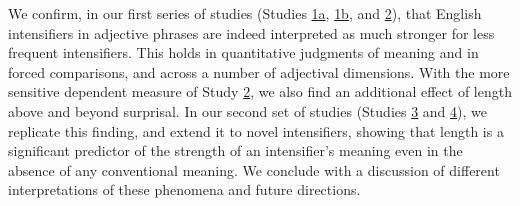 We confirm, in our first series of studies (Studies \hyperref[sec:study1a]{1a}, \hyperref[sec:study1b]{1b}, and \hyperref[sec:study2]{2}), that English intensifiers in adjective phrases are indeed interpreted as much stronger for less frequent intensifiers.
This holds in quantitative judgments of meaning and in forced comparisons, and across a number of adjectival dimensions.
With the more sensitive dependent measure of Study \hyperref[sec:study2]{2}, we also find an additional effect of length above and beyond surprisal.
In our second set of studies (Studies \hyperref[sec:study3]{3} and \hyperref[sec:study4]{4}), we replicate this finding, and extend it to novel intensifiers, showing that length is a significant predictor of the strength of an intensifier's meaning even in the absence of any conventional meaning.
We conclude with a discussion of different interpretations of these phenomena and future directions.
